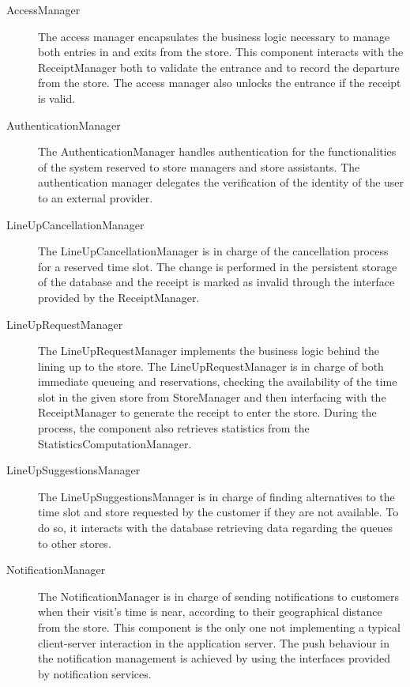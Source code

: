 \documentclass[../../main.tex]{subfiles}
\begin{document}
\begin{description}
    
    \item[AccessManager] The access manager encapsulates the business logic necessary to manage both entries in and exits from the store. 
    This component interacts with the ReceiptManager both to validate the entrance and to record the departure from the store. 
    The access manager also unlocks the entrance if the receipt is valid. 

    \item[AuthenticationManager] The AuthenticationManager handles authentication for the functionalities of the 
    system reserved to store managers and store assistants. The authentication manager delegates the verification of the 
    identity of the user to an external provider.

    \item[LineUpCancellationManager] The LineUpCancellationManager is in charge of the cancellation process for 
    a reserved time slot. The change is performed in the persistent storage of the database and the receipt is marked as 
    invalid through the interface provided by the ReceiptManager.
    
    \item[LineUpRequestManager] The LineUpRequestManager implements the business logic behind the lining up to the store. 
    The LineUpRequestManager is in charge of both immediate queueing and reservations, 
    checking the availability of the time slot in the given store from StoreManager and then interfacing with the 
    ReceiptManager to generate the receipt to enter the store. During the process, the component also retrieves 
    statistics from the StatisticsComputationManager.

    \item[LineUpSuggestionsManager] The LineUpSuggestionsManager is in charge of finding alternatives to the time slot and 
    store requested by the customer if they are not available. To do so, it interacts with the database retrieving data 
    regarding the queues to other stores.

    \item[NotificationManager] The NotificationManager is in charge of sending notifications to customers when their visit's time is near, 
    according to their geographical distance from the store. This component is the only one not implementing a typical 
    client-server interaction in the application server. The push behaviour in the notification management is 
    achieved by using the interfaces provided by notification services.


\end{description}
\end{document}
